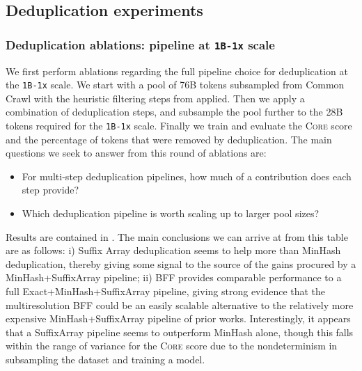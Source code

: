 \documentclass{article}
\newcommand{\strack}{\texttt{1B-1x}\xspace}
\newcommand{\lowvar}{\textsc{Core}\xspace}
\newcommand{\commoncrawl}{Common Crawl\xspace}
\begin{document}
\subsection{Deduplication experiments}


\subsubsection{Deduplication ablations: pipeline at \strack scale}\label{subsubsec:dedup-strack}
We first perform ablations regarding the full pipeline choice for deduplication at the \strack scale. We start with a pool of 76B tokens subsampled from \commoncrawl with the heuristic filtering steps from \citet{refinedweb} applied. Then we apply a combination of deduplication steps, and subsample the pool further to the 28B tokens required for the \strack scale. Finally we train and evaluate the \lowvar score and the percentage of tokens that were removed by deduplication. The main questions we seek to answer from this round of ablations are:
\begin{itemize}
\item For multi-step deduplication pipelines, how much of a contribution does each step provide?
\item Which deduplication pipeline is worth scaling up to larger pool sizes?
\end{itemize}
Results are contained in . The main conclusions we can arrive at from this table are as follows: i) Suffix Array deduplication seems to help more than MinHash deduplication, thereby giving some signal to the source of the gains procured by a MinHash+SuffixArray pipeline; ii) BFF provides comparable performance to a full Exact+MinHash+SuffixArray pipeline, giving strong evidence that the multiresolution BFF could be an easily scalable alternative to the relatively more expensive MinHash+SuffixArray pipeline of prior works. Interestingly, it appears that a SuffixArray pipeline seems to outperform MinHash alone, though this falls within the range of variance for the \lowvar score due to the nondeterminism in subsampling the dataset and training a model.
\end{document}
